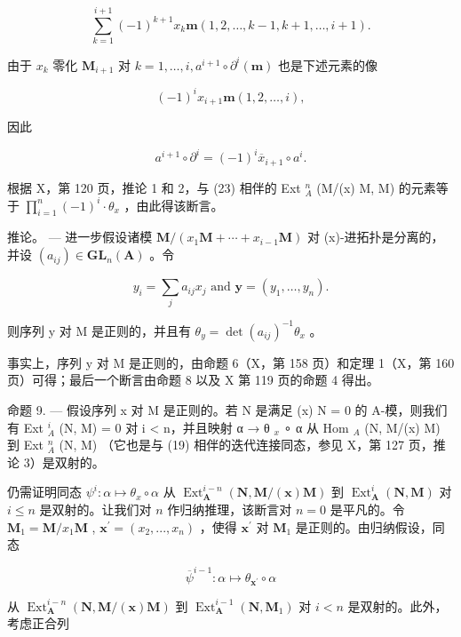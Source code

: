 \[
\sum_ {k = 1} ^ {i + 1} (- 1) ^ {k + 1} x _ {k} \boldsymbol {m} (1, 2, \dots , k - 1, k + 1, \dots , i + 1).
\]

由于 \(x_{k}\) 零化 \(\mathbf{M}_{i+1}\) 对 \(k=1,\ldots,i,a^{i+1}\circ\partial^{i}(\boldsymbol{m})\) 也是下述元素的像

\[
(- 1) ^ {i} x _ {i + 1} \boldsymbol {m} (1, 2, \dots , i),
\]

因此

\[
a ^ {i + 1} \circ \partial^ {i} = (- 1) ^ {i} \overline {{{x}}} _ {i + 1} \circ a ^ {i}.
\]

根据 X，第 120 页，推论 1 和 2，与 (23) 相伴的 Ext \(_{A}^{n}\) (M/(x) M, M) 的元素等于 \(\prod_{i=1}^{n} (-1)^{i} \cdot \theta_{x}\) ，由此得该断言。

推论。 — 进一步假设诸模 \(\mathbf{M}/(x_{1}\mathbf{M}+\cdots+x_{i-1}\mathbf{M})\) 对 (x)-进拓扑是分离的，并设 \((a_{ij})\in\mathbf{GL}_{n}(\mathbf{A})\) 。令

\[
y _ {i} = \sum_ {j} a _ {i j} x _ {j} \text { and } \mathbf {y} = (y _ {1}, \dots , y _ {n}).
\]

则序列 y 对 M 是正则的，并且有 \(\theta_{y} = \det (a_{ij})^{-1}\theta_{x}\) 。

事实上，序列 y 对 M 是正则的，由命题 6（X，第 158 页）和定理 1（X，第 160 页）可得；最后一个断言由命题 8 以及 X 第 119 页的命题 4 得出。

命题 9. --- 假设序列 x 对 M 是正则的。若 N 是满足 (x) N = 0 的 A-模，则我们有 Ext \(_{A}^{i}\) (N, M) = 0 对 i \textless{} n，并且映射 α → θ \(_{x}\) ∘ α 从 Hom \(_{A}\) (N, M/(x) M) 到 Ext \(_{A}^{n}\) (N, M) （它也是与 (19) 相伴的迭代连接同态，参见 X，第 127 页，推论 3）是双射的。

仍需证明同态 \(\psi^{i}:\alpha\mapsto\theta_{x}\circ\alpha\) 从 \(\operatorname{Ext}_{\mathbf{A}}^{i-n}(\mathbf{N},\mathbf{M}/(\mathbf{x})\mathbf{M})\) 到 \(\operatorname{Ext}_{\mathbf{A}}^{i}(\mathbf{N},\mathbf{M})\) 对 \(i\leqslant n\) 是双射的。让我们对 \(n\) 作归纳推理，该断言对 \(n=0\) 是平凡的。令 \(\mathbf{M}_{1}=\mathbf{M}/x_{1}\mathbf{M}\) , \(\mathbf{x}^{\prime}=(x_{2},...,x_{n})\) ，使得 \(\mathbf{x}^{\prime}\) 对 \(\mathbf{M}_{1}\) 是正则的。由归纳假设，同态

\[
\overline {{{{\psi}}}} ^ {i - 1}: \alpha \mapsto \theta_ {\boldsymbol {x} ^ {\prime}} \circ \alpha
\]

从 \(\operatorname{Ext}_{\mathbf{A}}^{i-n}(\mathbf{N}, \mathbf{M}/(\mathbf{x})\mathbf{M})\) 到 \(\operatorname{Ext}_{\mathbf{A}}^{i-1}(\mathbf{N}, \mathbf{M}_1)\) 对 \(i < n\) 是双射的。此外，考虑正合列

